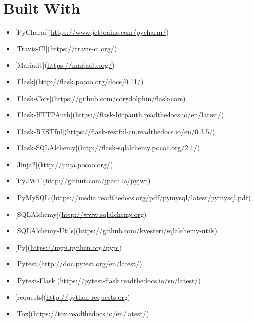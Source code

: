 \documentclass[letterpaper,10pt,english]{sphinxmanual}
\begin{document}
\section{Built With}
\label{\detokenize{installation:built-with}}\begin{itemize}
\item {} 
{[}PyCharm{]}(\url{https://www.jetbrains.com/pycharm/})

\item {} 
{[}Travis-CI{]}(\url{https://travis-ci.org/})

\item {} 
{[}Mariadb{]}(\url{https://mariadb.org/})

\item {} 
{[}Flask{]}(\url{http://flask.pocoo.org/docs/0.11/})

\item {} 
{[}Flask-Cors{]}(\url{https://github.com/corydolphin/flask-cors})

\item {} 
{[}Flask-HTTPAuth{]}(\url{https://flask-httpauth.readthedocs.io/en/latest/})

\item {} 
{[}Flask-RESTful{]}(\url{https://flask-restful-cn.readthedocs.io/en/0.3.5/})

\item {} 
{[}Flask-SQLAlchemy{]}(\url{http://flask-sqlalchemy.pocoo.org/2.1/})

\item {} 
{[}Jinja2{]}(\url{http://jinja.pocoo.org/})

\item {} 
{[}PyJWT{]}(\url{http://github.com/jpadilla/pyjwt})

\item {} 
{[}PyMySQL{]}(\url{https://media.readthedocs.org/pdf/pymysql/latest/pymysql.pdf})

\item {} 
{[}SQLAlchemy{]}(\url{http://www.sqlalchemy.org})

\item {} 
{[}SQLAlchemy-Utils{]}(\url{https://github.com/kvesteri/sqlalchemy-utils})

\item {} 
{[}Py{]}(\url{https://pypi.python.org/pypi})

\item {} 
{[}Pytest{]}(\url{http://doc.pytest.org/en/latest/})

\item {} 
{[}Pytest-Flask{]}(\url{https://pytest-flask.readthedocs.io/en/latest/})

\item {} 
{[}requests{]}(\url{http://python-requests.org})

\item {} 
{[}Tox{]}(\url{https://tox.readthedocs.io/en/latest/})

\end{itemize}
\end{document}
